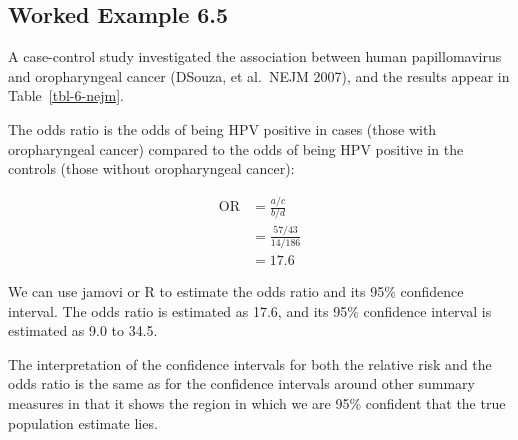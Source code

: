 \documentclass[
  a4paper,
]{memoir}
\begin{document}
\subsection{Worked Example 6.5}\label{worked-example-6.5}

A case-control study investigated the association between human
papillomavirus and oropharyngeal cancer (D\textquotesingle Souza, et
al.~NEJM 2007), and the results appear in Table~\ref{tbl-6-nejm}.

\begin{table}[h]

\caption{\label{tbl-6-nejm}Association between human papillomavirus and
oropharyngeal cancer}


\end{table}%

The odds ratio is the odds of being HPV positive in cases (those with
oropharyngeal cancer) compared to the odds of being HPV positive in the
controls (those without oropharyngeal cancer):

\[
\begin{aligned}
\text{OR} &= \frac{a / c}{b /d} \\
  &= \frac{57 / 43}{14 / 186} \\
  &= 17.6
\end{aligned}
\]

We can use jamovi or R to estimate the odds ratio and its 95\%
confidence interval. The odds ratio is estimated as 17.6, and its 95\%
confidence interval is estimated as 9.0 to 34.5.

The interpretation of the confidence intervals for both the relative
risk and the odds ratio is the same as for the confidence intervals
around other summary measures in that it shows the region in which we
are 95\% confident that the true population estimate lies.
\end{document}

